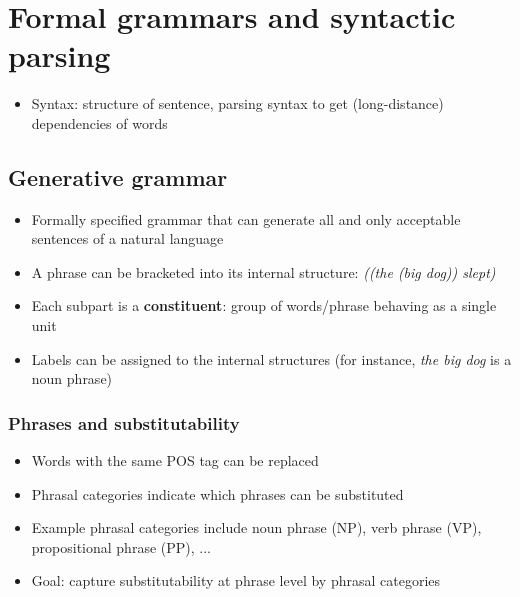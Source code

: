 \section{Formal grammars and syntactic parsing}
\begin{itemize}
	\item Syntax: structure of sentence, parsing syntax to get (long-distance) dependencies of words
\end{itemize}

\subsection{Generative grammar}
\begin{itemize}
	\item Formally specified grammar that can generate all and only acceptable sentences of a natural language
	\item A phrase can be bracketed into its internal structure: \textit{((the (big dog)) slept)}
	\item Each subpart is a \textbf{constituent}: group of words/phrase behaving as a single unit 
	\item Labels can be assigned to the internal structures (for instance, \textit{the big dog} is a noun phrase)
\end{itemize}
\subsubsection{Phrases and substitutability}
\begin{itemize}
	\item Words with the same POS tag can be replaced
	\item Phrasal categories indicate which phrases can be substituted
	\item Example phrasal categories include noun phrase (NP), verb phrase (VP), propositional phrase (PP), ...
	\item Goal: capture substitutability at phrase level by phrasal categories
\end{itemize}
